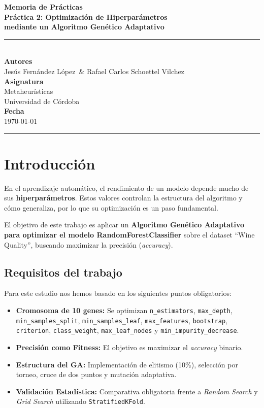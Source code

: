 \documentclass[12pt, a4paper]{article}
\newcommand{\reporttitle}{Práctica 2: Optimización de Hiperparámetros\\[0.3cm]
\large mediante un Algoritmo Genético Adaptativo}
\newcommand{\reportdate}{\today}
\newcommand{\authorA}{Jesús Fernández López}
\newcommand{\authorB}{Rafael Carlos Schoettel Vilchez}
\begin{document}

\begin{titlepage}
  \centering
  \vspace*{3cm}
  {\Huge \textbf{Memoria de Prácticas}}\\[0.8cm]
  {\LARGE \textbf{\reporttitle}}\\[0.5cm]
  \rule{\textwidth}{0.4pt}\\[2cm]
  {\Large \textbf{Autores}}\\[0.4cm]
  {\large \authorA\ \& \authorB}\\[1.5cm]
  {\Large \textbf{Asignatura}}\\[0.4cm]
  {\large Metaheurísticas}\\[0.4cm]
  {\normalsize Universidad de Córdoba}\\[1.5cm]
  {\Large \textbf{Fecha}}\\[0.4cm]
  {\large \reportdate}
  \vfill
  \rule{\textwidth}{0.4pt}
\end{titlepage}

\newpage
\tableofcontents
\newpage

\section{Introducción}

En el aprendizaje automático, el rendimiento de un modelo depende mucho de sus
\textbf{hiperparámetros}. Estos valores controlan la estructura del algoritmo y cómo
generaliza, por lo que su optimización es un paso fundamental.

El objetivo de este trabajo es aplicar un \textbf{Algoritmo Genético Adaptativo para
optimizar el modelo RandomForestClassifier} sobre el dataset ``Wine Quality'', buscando
maximizar la precisión (\textit{accuracy}).

\subsection{Requisitos del trabajo}

Para este estudio nos hemos basado en los siguientes puntos obligatorios:

\begin{itemize}[itemsep=0.2em]
  \item \textbf{Cromosoma de 10 genes:} Se optimizan \texttt{n\_estimators}, \texttt{max\_depth},
        \texttt{min\_samples\_split}, \texttt{min\_samples\_leaf}, \texttt{max\_features},
        \texttt{bootstrap}, \texttt{criterion}, \texttt{class\_weight}, \texttt{max\_leaf\_nodes}
        y \texttt{min\_impurity\_decrease}.
  \item \textbf{Precisión como Fitness:} El objetivo es maximizar el \textit{accuracy} binario.
  \item \textbf{Estructura del GA:} Implementación de elitismo (10\%), selección por torneo,
        cruce de dos puntos y mutación adaptativa.
  \item \textbf{Validación Estadística:} Comparativa obligatoria frente a \textit{Random Search}
        y \textit{Grid Search} utilizando \texttt{StratifiedKFold}.
\end{itemize}
\end{document}

